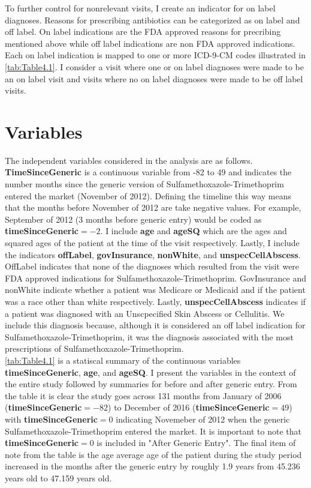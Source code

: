 \indent To further control for nonrelevant visits, I create an indicator for on label diagnoses. Reasons for prescribing antibiotics can be categorized as on label and off label. On label indications are the FDA approved reasons for precribing mentioned above while off label indications are non FDA approved indications. Each on label indication is mapped to one or more ICD-9-CM codes illustrated in \autoref{tab:Table4.1}. I consider a visit where one or on label diagnoses were made to be an on label visit and visits where no on label diagnoses were made to be off label visits. 

\section{Variables}
The independent variables considered in the analysis are as follows. \textbf{TimeSinceGeneric} is a continuous variable from -82 to 49 and indicates the number months since the generic version of Sulfamethoxazole-Trimethoprim entered the market (November of 2012). Defining the timeline this way means that the months before November of 2012 are take negative values. For example, September of 2012 (3 months before generic entry) would be coded as \textbf{timeSinceGeneric}$=-2$. I include \textbf{age} and \textbf{ageSQ} which are the ages and squared ages of the patient at the time of the visit respectively. Lastly, I include the indicators \textbf{offLabel}, \textbf{govInsurance}, \textbf{nonWhite}, and \textbf{unspecCellAbscess}. OffLabel indicates that none of the diagnoses which resulted from the visit were FDA approved indications for Sulfamethoxazole-Trimethoprim. GovInsurance and nonWhite indicate whether a patient was Medicare or Medicaid and if the patient was a race other than white respectively. Lastly, \textbf{unspecCellAbscess} indicates if a patient was diagnosed with an Unscpecified Skin Abscess or Cellulitis. We include this diagnosis because, although it is considered an off label indication for Sulfamethoxazole-Trimethoprim, it was the diagnosis associated with the most prescriptions of Sulfamethoxazole-Trimethoprim.\\
\indent \autoref{tab:Table4.1} is a statiscal summary of the continuous variables \textbf{timeSinceGeneric}, \textbf{age}, and \textbf{ageSQ}. I present the variables in the context of the entire study followed by summaries for before and after generic entry. From the table it is clear the study goes across 131 months from January of 2006 (\textbf{timeSinceGeneric}$=-82$) to December of 2016 (\textbf{timeSinceGeneric}$=49$) with \textbf{timeSinceGeneric}$=0$ indicating Novemeber of 2012 when the generic Sulfamethoxazole-Trimethoprim entered the market. It is important to note that \textbf{timeSinceGeneric}$=0$ is included in "After Generic Entry". The final item of note from the table is the age average age of the patient during the study period increased in the months after the generic entry by roughly 1.9 years from 45.236 years old to 47.159 years old.\\
